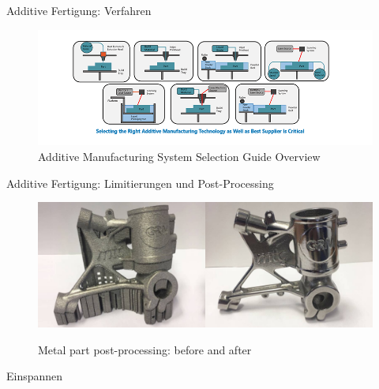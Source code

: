 \documentclass[../slides.tex]{subfiles}
\begin{document}
\begin{frame}{Additive Fertigung: Verfahren}
  \begin{minipage}[t]{\textwidth}
    \begin{figure}[]
      \includegraphics[width=\textwidth]{img_niklas/selecting-additive-manufacturing-technology-sm.png}
      \caption[short]{Additive Manufacturing System Selection Guide Overview}
    \end{figure}
  \end{minipage}
\end{frame}

\begin{frame}{Additive Fertigung: Limitierungen und Post-Processing}
  \begin{minipage}[t]{\textwidth}
    \begin{figure}[]
      \includegraphics[width=\textwidth]{img_niklas/image-32-1024x384.png}
      \label{fig:meine-grafik}
      \caption[short]{Metal part post-processing: before and after}
    \end{figure}
  \end{minipage}
\end{frame}

\begin{frame}{Einspannen}
  
\end{frame}
\end{document}
